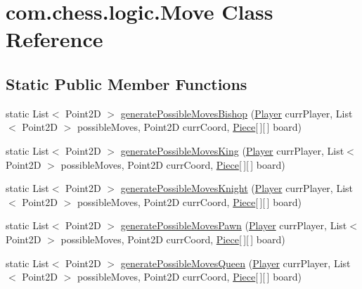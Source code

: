\hypertarget{classcom_1_1chess_1_1logic_1_1_move}{}\section{com.\+chess.\+logic.\+Move Class Reference}
\label{classcom_1_1chess_1_1logic_1_1_move}
\subsection*{Static Public Member Functions}
\begin{DoxyCompactItemize}
\item 
static List$<$ Point2D $>$ \mbox{\hyperlink{classcom_1_1chess_1_1logic_1_1_move_a4cc801633898121029d4676632a51a8e}{generate\+Possible\+Moves\+Bishop}} (\mbox{\hyperlink{classcom_1_1chess_1_1logic_1_1_player}{Player}} curr\+Player, List$<$ Point2D $>$ possible\+Moves, Point2D curr\+Coord, \mbox{\hyperlink{classcom_1_1chess_1_1pieces_1_1_piece}{Piece}}\mbox{[}$\,$\mbox{]}\mbox{[}$\,$\mbox{]} board)
\item 
static List$<$ Point2D $>$ \mbox{\hyperlink{classcom_1_1chess_1_1logic_1_1_move_aa7f07801867eeecf641eca909307828d}{generate\+Possible\+Moves\+King}} (\mbox{\hyperlink{classcom_1_1chess_1_1logic_1_1_player}{Player}} curr\+Player, List$<$ Point2D $>$ possible\+Moves, Point2D curr\+Coord, \mbox{\hyperlink{classcom_1_1chess_1_1pieces_1_1_piece}{Piece}}\mbox{[}$\,$\mbox{]}\mbox{[}$\,$\mbox{]} board)
\item 
static List$<$ Point2D $>$ \mbox{\hyperlink{classcom_1_1chess_1_1logic_1_1_move_ae3edb4792a48a7e3e161f91dd752d1a4}{generate\+Possible\+Moves\+Knight}} (\mbox{\hyperlink{classcom_1_1chess_1_1logic_1_1_player}{Player}} curr\+Player, List$<$ Point2D $>$ possible\+Moves, Point2D curr\+Coord, \mbox{\hyperlink{classcom_1_1chess_1_1pieces_1_1_piece}{Piece}}\mbox{[}$\,$\mbox{]}\mbox{[}$\,$\mbox{]} board)
\item 
static List$<$ Point2D $>$ \mbox{\hyperlink{classcom_1_1chess_1_1logic_1_1_move_aebd7245c1458b2cba8ac2d2a2ee76fdb}{generate\+Possible\+Moves\+Pawn}} (\mbox{\hyperlink{classcom_1_1chess_1_1logic_1_1_player}{Player}} curr\+Player, List$<$ Point2D $>$ possible\+Moves, Point2D curr\+Coord, \mbox{\hyperlink{classcom_1_1chess_1_1pieces_1_1_piece}{Piece}}\mbox{[}$\,$\mbox{]}\mbox{[}$\,$\mbox{]} board)
\item 
static List$<$ Point2D $>$ \mbox{\hyperlink{classcom_1_1chess_1_1logic_1_1_move_a5038da32a0d606713e548d7e2f7c0cf8}{generate\+Possible\+Moves\+Queen}} (\mbox{\hyperlink{classcom_1_1chess_1_1logic_1_1_player}{Player}} curr\+Player, List$<$ Point2D $>$ possible\+Moves, Point2D curr\+Coord, \mbox{\hyperlink{classcom_1_1chess_1_1pieces_1_1_piece}{Piece}}\mbox{[}$\,$\mbox{]}\mbox{[}$\,$\mbox{]} board)

\end{DoxyCompactItemize}
